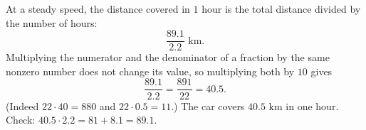 At a steady speed, the distance covered in $1$ hour is the total distance divided by the number of hours:
\[
\dfrac{89.1}{2.2}\text{ km}.
\]
Multiplying the numerator and the denominator of a fraction by the same nonzero number does not change its value, so multiplying both by $10$ gives
\[
\dfrac{89.1}{2.2}=\dfrac{891}{22}=40.5 .
\]
(Indeed $22\cdot40=880$ and $22\cdot0.5=11$.) The car covers $\boxed{40.5\text{ km}}$ in one hour. Check: $40.5\cdot2.2=81+8.1=89.1$.
